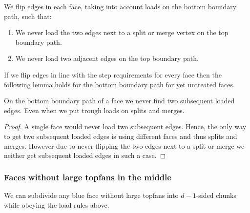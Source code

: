   We flip edges in each face, taking into account loads on the bottom boundary path, such that:

  \begin{enumerate}
    \item We never load the two edges next to a split or merge vertex on the top boundary path.
    \item We never load two adjacent edges on the top boundary path.
  \end{enumerate}

  If we flip edges in line with the step requirements for every face then the following lemma holds for the bottom boundary path for yet untreated faces.

  \begin{lemma}
    \label{lm:}
    On the bottom boundary path of a face we never find two subsequent loaded edges. Even when we put trough loads on splits and merges.
  \end{lemma}
  \begin{proof}
    A single face would never load two subsequent edges. Hence, the only way to get two subsequent loaded edges is using different faces and thus splits and merges.
    However due to never flipping the two edges next to a split or merge we neither get subsequent loaded edges in such a case.
  \end{proof}


\subsubsection{Faces without large topfans in the middle}
  \begin{lemma}
    \label{lm:subdiv:withoutTopfan}
    We can subdivide any blue face without large topfans into $d-1$-sided chunks while obeying the load rules above.
  \end{lemma}

